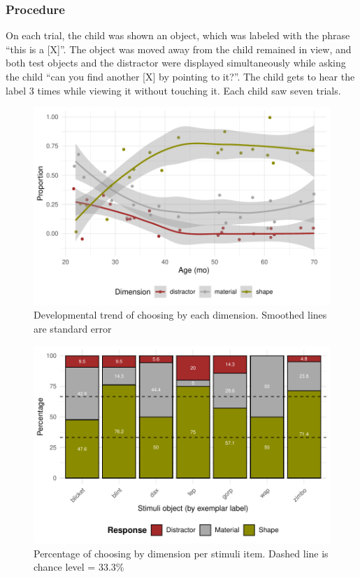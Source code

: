 \documentclass[10pt, letterpaper]{article}
\begin{document}
\subsubsection{Procedure}\label{procedure}

On each trial, the child was shown an object, which was labeled with the
phrase ``this is a {[}X{]}''. The object was moved away from the child
remained in view, and both test objects and the distractor were
displayed simultaneously while asking the child ``can you find another
{[}X{]} by pointing to it?''. The child gets to hear the label 3 times
while viewing it without touching it. Each child saw seven trials.

\begin{CodeChunk}
\begin{figure}[tb]
\includegraphics[width=1\linewidth]{figs/first_exp-1} \caption[Developmental trend of choosing by each dimension]{Developmental trend of choosing by each dimension. Smoothed lines are standard error}\label{fig:first_exp}
\end{figure}
\end{CodeChunk}

\begin{CodeChunk}
\begin{figure}[tb]
\includegraphics[width=1\linewidth]{figs/first_exp_stim-1} \caption[Percentage of choosing by dimension per stimuli item]{Percentage of choosing by dimension per stimuli item. Dashed line is chance level = 33.3\% }\label{fig:first_exp_stim}
\end{figure}
\end{CodeChunk}
\end{document}
